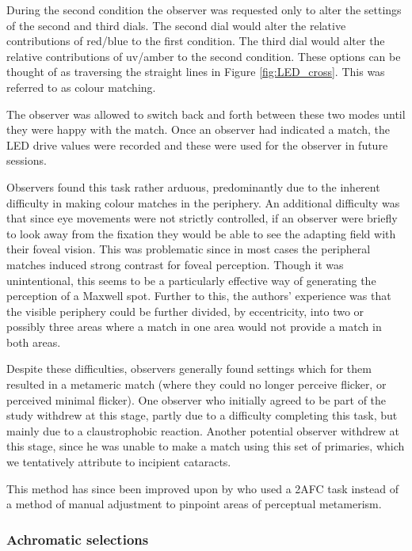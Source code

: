 During the second condition the observer was requested only to alter the settings of the second and third dials. The second dial would alter the relative contributions of red/blue to the first condition. The third dial would alter the relative contributions of uv/amber to the second condition. These options can be thought of as traversing the straight lines in Figure \ref{fig:LED_cross}. This was referred to as colour matching.


The observer was allowed to switch back and forth between these two modes until they were happy with the match. Once an observer had indicated a match, the LED drive values were recorded and these were used for the observer in future sessions.

Observers found this task rather arduous, predominantly due to the inherent difficulty in making colour matches in the periphery. An additional difficulty was that since eye movements were not strictly controlled, if an observer were briefly to look away from the fixation they would be able to see the adapting field with their foveal vision. This was problematic since in most cases the peripheral matches induced strong contrast for foveal perception. Though it was unintentional, this seems to be a particularly effective way of generating the perception of a Maxwell spot. Further to this, the authors' experience was that the visible periphery could be further divided, by eccentricity, into two or possibly three areas where a match in one area would not provide a match in both areas.

Despite these difficulties, observers generally found settings which for them resulted in a metameric match (where they could no longer perceive flicker, or perceived minimal flicker). One observer who initially agreed to be part of the study withdrew at this stage, partly due to a difficulty completing this task, but mainly due to a claustrophobic reaction. Another potential observer withdrew at this stage, since he was unable to make a match using this set of primaries, which we tentatively attribute to incipient cataracts.

This method has since been improved upon by \citet{allen_form_2019} who used a 2AFC task instead of a method of manual adjustment to pinpoint areas of perceptual metamerism.

\subsubsection{Achromatic selections}

